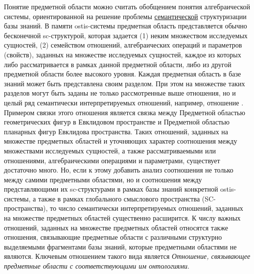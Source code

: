\begin{SCn}
{Понятие предметной области можно считать обобщением понятия алгебраической системы, ориентированной на решение проблемы \uline{семантической} структуризации базы знаний. В памяти ostis-системы предметная область представляется обычно бесконечной sc-структурой, которая задается (1) неким множеством исследуемых сущностей, (2) семейством отношений, алгебраических операций и параметров (свойств), заданных на множестве исследуемых сущностей, каждое из которых либо рассматривается в рамках данной предметной области, либо  из другой предметной области более высокого уровня. Каждая предметная область в базе знаний может быть представлена своим разделом. При этом на множестве таких разделов могут быть заданы не только рассмотренные выше  отношения, но и целый ряд семантически интерпретируемых отношений, например, отношение . Примером связки этого отношения является связка между Предметной областью геометрических фигур в Евклидовом пространстве и Предметной областью планарных фигур Евклидова пространства. Таких отношений, заданных на множестве предметных областей и уточняющих характер соотношения между множествами исследуемых сущностей, а также рассматриваемыми или  отношениями, алгебраическими операциями и параметрами, существует достаточно много. Но, если к этому добавить анализ соотношения не только между самими предметными областями, но и соотношения между представляющими их sc-структурами в рамках базы знаний конкретной ostis-системы, а также в рамках глобального смыслового пространства (SC-пространства), то число семантически интерпретируемых отношений, заданных на множестве предметных областей существенно расширится. К числу важных отношений, заданных на множестве предметных областей относятся также отношения, связывающие предметные области с различными структурно выделяемыми фрагментами базы знаний, которые предметными областями не являются. Ключевым отношением такого вида является \textit{Отношение, связывающее предметные области с соответствующими им онтологиями}.} 

\filemodetrue
{}
\filemodefalse


\end{SCn}

